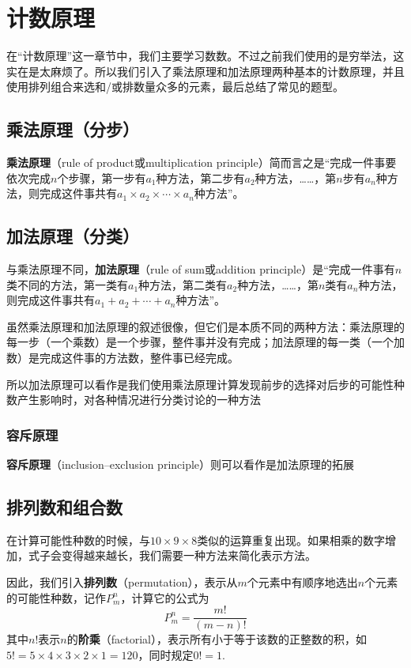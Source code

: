 \chapter{计数原理}
在“计数原理”这一章节中，我们主要学习数数。不过之前我们使用的是穷举法，这实在是太麻烦了。所以我们引入了乘法原理和加法原理两种基本的计数原理，并且使用排列组合来选和/或排数量众多的元素，最后总结了常见的题型。

\section[乘法原理]{乘法原理（分步）}
\textbf{乘法原理}（rule of product或multiplication principle）简而言之是“完成一件事要依次完成$n$个步骤，第一步有$a_1$种方法，第二步有$a_2$种方法，\ldots\ldots，第$n$步有$a_n$种方法，则完成这件事共有$a_1\times a_2 \times\cdots\times a_n$种方法”。

\section[加法原理]{加法原理（分类）}
与乘法原理不同，\textbf{加法原理}（rule of sum或addition principle）是“完成一件事有$n$类不同的方法，第一类有$a_1$种方法，第二类有$a_2$种方法，\ldots\ldots，第$n$类有$a_n$种方法，则完成这件事共有$a_1+a_2+\cdots+a_n$种方法”。

虽然乘法原理和加法原理的叙述很像，但它们是本质不同的两种方法：乘法原理的每一步（一个乘数）是一个步骤，整件事并没有完成；加法原理的每一类（一个加数）是完成这件事的方法数，整件事已经完成。

所以加法原理可以看作是我们使用乘法原理计算发现前步的选择对后步的可能性种数产生影响时，对各种情况进行分类讨论的一种方法

\subsection{容斥原理}
\textbf{容斥原理}（inclusion–exclusion principle）则可以看作是加法原理的拓展

\section{排列数和组合数}
在计算可能性种数的时候，与$10\times 9\times 8$类似的运算重复出现。如果相乘的数字增加，式子会变得越来越长，我们需要一种方法来简化表示方法。

因此，我们引入\textbf{排列数}（permutation），表示从$m$个元素中有顺序地选出$n$个元素的可能性种数，记作$P_m^n$，计算它的公式为\[P_m^n=\frac{m!}{(m-n)!}\]其中$n!$表示$n$的\textbf{阶乘}（factorial），表示所有小于等于该数的正整数的积，如$5!=5\times 4\times 3\times 2\times 1=120$，同时规定$0!=1$.

